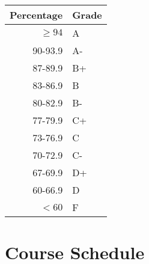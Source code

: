 \documentclass{tufte-handout}
\begin{document}
\begin{margintable}
\begin{tabular}{rl}
Percentage & Grade \\
\hline 
$\ge94$ & A \\
90-93.9 & A- \\
87-89.9 & B+ \\
83-86.9 & B \\
80-82.9 & B- \\
77-79.9 & C+ \\
73-76.9 & C \\
70-72.9 & C- \\
67-69.9 & D+ \\
60-66.9 & D \\
$<60$ & F \\
\hline
\end{tabular}
\end{margintable}





\section{Course Schedule}
\end{document}
